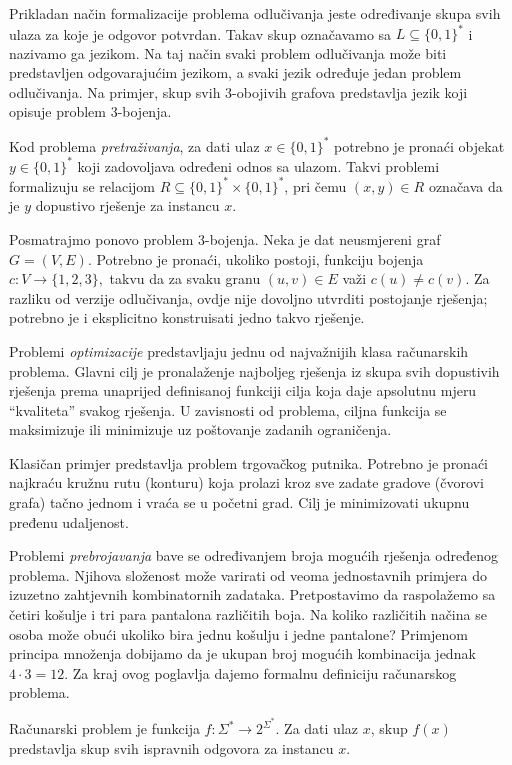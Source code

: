 Prikladan način formalizacije problema odlučivanja jeste određivanje skupa svih ulaza za koje je odgovor potvrdan. Takav skup označavamo sa $L \subseteq \{0,1\}^*$ i nazivamo ga jezikom. Na taj način svaki problem odlučivanja može biti predstavljen odgovarajućim jezikom, a svaki jezik određuje jedan problem odlučivanja. Na primjer, skup svih 3-obojivih grafova predstavlja jezik koji opisuje problem 3-bojenja.

Kod problema \textit{pretraživanja}, za dati ulaz $x \in \{0,1\}^*$ potrebno je pronaći objekat $y \in \{0,1\}^*$ koji zadovoljava određeni odnos sa ulazom. Takvi problemi formalizuju se relacijom $R \subseteq \{0,1\}^* \times \{0,1\}^*$, pri čemu $(x,y)\in R$ označava da je $y$ dopustivo rješenje za instancu $x$.

Posmatrajmo ponovo problem 3-bojenja. Neka je dat neusmjereni graf $G=(V,E)$. Potrebno je pronaći, ukoliko postoji, funkciju bojenja $c \colon V \rightarrow \{1,2,3\}, 
$ takvu da za svaku granu $(u,v)\in E$ važi $c(u)\neq c(v)$. Za razliku od verzije odlučivanja, ovdje nije dovoljno utvrditi postojanje rješenja; potrebno je i eksplicitno konstruisati jedno takvo rješenje.

Problemi \textit{optimizacije} predstavljaju jednu od najvažnijih klasa računa\-rskih problema. Glavni cilj je pronalaženje najboljeg rješenja iz skupa svih dopustivih rješenja prema unaprijed definisanoj funkciji cilja koja daje apsolutnu mjeru ``kvaliteta'' svakog rješenja. U zavisnosti od problema, ciljna funkcija se maksimizuje ili minimizuje uz poštovanje zadanih ograničenja.

Klasičan primjer predstavlja problem trgovačkog putnika. Potrebno je pronaći najkraću kružnu rutu (konturu) koja prolazi kroz sve zadate gradove (čvorovi grafa) tačno jednom i vraća se u početni grad. Cilj je minimizovati ukupnu pređenu udaljenost.

Problemi \textit{prebrojavanja} bave se određivanjem broja mogućih rješenja određenog problema. Njihova složenost može varirati od veoma jednostavnih primjera do izuzetno zahtjevnih kombinatornih zadataka.  Pretpostavimo da raspolažemo sa četiri košulje i tri para pantalona različitih boja. Na koliko različitih načina se osoba može obući ukoliko bira jednu košulju i jedne pantalone? Primjenom principa množenja dobijamo da je ukupan broj mogućih kombinacija jednak  $
4 \cdot 3 = 12.
$ Za kraj ovog poglavlja dajemo formalnu definiciju računarskog problema.

\begin{definition}
	Računarski problem je funkcija 	$
	f \colon \Sigma^* \rightarrow 2^{\Sigma^*}.
	$ Za dati ulaz $x$, skup $f(x)$ predstavlja skup svih ispravnih odgovora za instancu $x$.
\end{definition}

